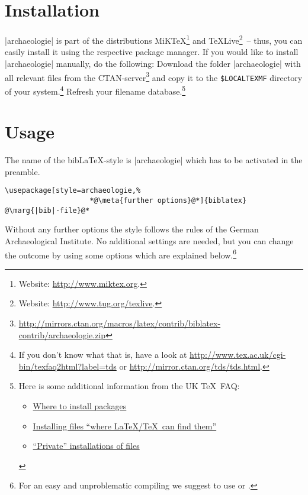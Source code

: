 \documentclass[a4paper,
10pt,
greek,
french,
spanish,
italian,
ngerman,
english
]{ltxdoc}
\begin{document}
\section{Installation}
|archaeologie| is part of the distributions MiK\TeX \footnote{Website: \url{http://www.miktex.org}.} 
and \TeX Live\footnote{Website: \url{http://www.tug.org/texlive}.}~-- thus, you
can easily install it using the respective package manager. 
If you would like to
install |archaeologie| manually, do the following:
Download the folder |archaeologie| with all relevant files from the CTAN-server\footnote{\url{http://mirrors.ctan.org/macros/latex/contrib/biblatex-contrib/archaeologie.zip}} and copy it to the \texttt{\$LOCALTEXMF} directory of
 your system.\footnote{If you don't know what that is, have a look at
\url{http://www.tex.ac.uk/cgi-bin/texfaq2html?label=tds} or 
\url{http://mirror.ctan.org/tds/tds.html}.} 
Refresh your filename database.\footnote{ 
Here is some additional information from the UK \TeX\ FAQ:
\begin{itemize}[nosep,after=\vspace{-\baselineskip} ]
	\item \href{%
    http://www.tex.ac.uk/cgi-bin/texfaq2html?label=install-where}{%
    Where to install packages}
	\item \href{%
	  http://www.tex.ac.uk/cgi-bin/texfaq2html?label=inst-wlcf}{%
	  Installing files \enquote{where \LaTeX /TeX\ can find them}}
	\item \href{%
	  http://www.tex.ac.uk/cgi-bin/texfaq2html?label=privinst}{%
	  \enquote{Private} installations of files}
\end{itemize}
}

\section{Usage}
   The name of the bib\LaTeX-style is  |archaeologie| which has to be activated in the preamble. 

\begin{lstlisting}
\usepackage[style=archaeologie,%
					*@\meta{further options}@*]{biblatex}
@\marg{|bib|-file}@*
\end{lstlisting}

Without any further options the style follows the rules of the German Archaeological Institute. 
No additional settings are needed,
but you can change the outcome by using some options which are explained below.\footnote{For an easy and unproblematic compiling we suggest to use  or  .}
\end{document}

